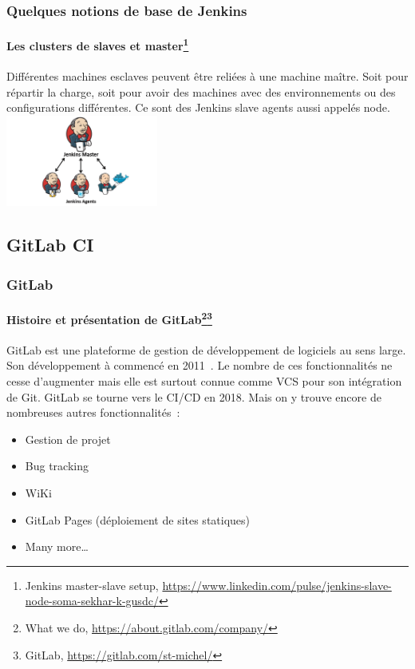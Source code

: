 \documentclass{beamer}
\begin{document}
    \begin{frame}
        \frametitle{Quelques notions de base de Jenkins}
        \framesubtitle{Les clusters de slaves et master\footnote{Jenkins master-slave setup, \url{https://www.linkedin.com/pulse/jenkins-slave-node-soma-sekhar-k-gusdc/}}}
        \transdissolve
        Différentes machines esclaves peuvent être reliées à une machine maître.
        Soit pour répartir la charge, soit pour avoir des machines avec des environnements ou des configurations différentes.
        Ce sont des Jenkins slave agents aussi appelés node.
        \bigbreak
        \centering
        \includegraphics[width=5cm]{image/jenkins-cluster}
    \end{frame}

    \subsection{GitLab CI}\label{subsec:gitlab-ci}

    \begin{frame}
        \frametitle{GitLab}
        \framesubtitle{Histoire et présentation de GitLab\footnote{What we do, \url{https://about.gitlab.com/company/}}\footnotestep\footnote{GitLab, \url{https://gitlab.com/st-michel/}}}
        \transdissolve
        GitLab est une plateforme de gestion de développement de logiciels au sens large.
        Son développement à commencé en 2011~.
        \bigbreak
        Le nombre de ces fonctionnalités ne cesse d'augmenter mais elle est surtout connue comme VCS pour son intégration de Git.
        \bigbreak
        GitLab se tourne vers le CI/CD en 2018.
        \bigbreak
        Mais on y trouve encore de nombreuses autres fonctionnalités~:
        \begin{itemize}
            \item Gestion de projet
            \item Bug tracking
            \item WiKi
            \item GitLab Pages (déploiement de sites statiques)
            \item Many more\ldots
        \end{itemize}
    \end{frame}
\end{document}
